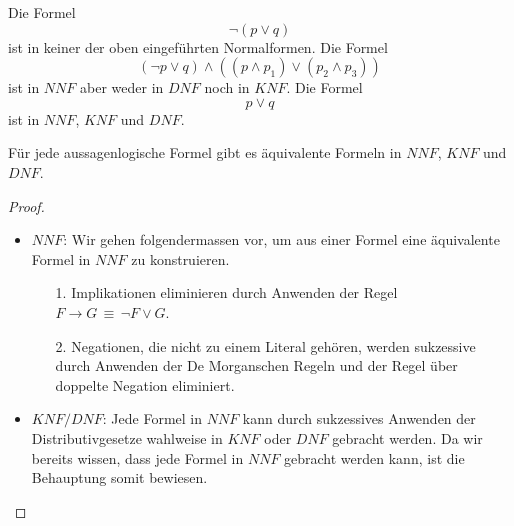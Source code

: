 \begin{bsp}
Die Formel
\[
\neg(p\lor q)
\]
ist in keiner der oben eingeführten Normalformen. Die Formel
\[
(\neg p\lor q)\land ((p\land p_1)\lor(p_2\land p_3))
\]
ist in $NNF$ aber weder in $DNF$ noch in $KNF$. Die Formel
\[
p\lor q
\]
ist in $NNF$, $KNF$ und $DNF$.
\end{bsp}

\begin{satz}
Für jede aussagenlogische Formel gibt es äquivalente Formeln in $NNF$, $KNF$ und $DNF$.
\end{satz}
\begin{proof}~
\begin{itemize}
\item $NNF$: Wir gehen folgendermassen vor, um aus einer Formel eine äquivalente Formel in $NNF$ zu konstruieren.
\begin{enumerate}
\item[1.] Implikationen eliminieren durch Anwenden der Regel $F\to G\,\equiv\,\neg F\lor G$.
\item[2.] Negationen, die nicht zu einem Literal gehören, werden sukzessive durch Anwenden der De Morganschen Regeln und der Regel über doppelte Negation eliminiert.
\end{enumerate}
\item $KNF/DNF$: Jede Formel in $NNF$ kann durch sukzessives Anwenden der Distributivgesetze wahlweise in $KNF$ oder $DNF$ gebracht werden. Da wir bereits wissen, dass jede Formel in $NNF$ gebracht werden kann, ist die Behauptung somit bewiesen.  \qedhere
\end{itemize}
\end{proof}

